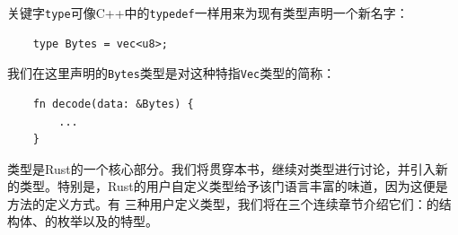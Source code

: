 \bigskip
{}
关键字\texttt{type}可像C++中的\texttt{typedef}一样用来为现有类型声明一个新名字：
\begin{verbatim}
    type Bytes = vec<u8>;
\end{verbatim}

\smallskip
我们在这里声明的\texttt{Bytes}类型是对这种特指\texttt{Vec}类型的简称：
\begin{verbatim}
    fn decode(data: &Bytes) {
        ...
    }
\end{verbatim}

\bigskip
{}
类型是Rust的一个核心部分。我们将贯穿本书，继续对类型进行讨论，并引入新的类型。特别是，Rust的用户自定义类型给予该门语言丰富的味道，因为这便是方法的定义方式。有
三种用户定义类型，我们将在三个连续章节介绍它们：的结构体、的枚举以及的特型。
